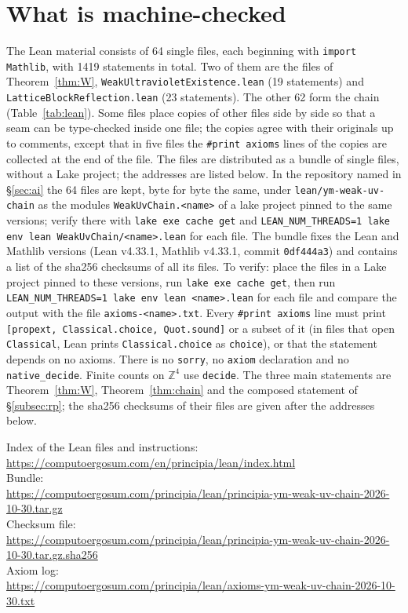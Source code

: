 \documentclass[11pt,a4paper]{article}
\theoremstyle{definition}
\theoremstyle{remark}
\begin{document}
\section{What is machine-checked}\label{sec:lean}

The Lean material consists of 64 single files, each beginning with \texttt{import Mathlib}, with 1419 statements in total. Two of them are the files of Theorem~\ref{thm:W}, \texttt{WeakUltraviolet\allowbreak{}Existence.lean} (19 statements) and \texttt{LatticeBlock\allowbreak{}Reflection.lean} (23 statements). The other 62 form the chain (Table~\ref{tab:lean}). Some files place copies of other files side by side so that a seam can be type-checked inside one file; the copies agree with their originals up to comments, except that in five files the \texttt{\#print axioms} lines of the copies are collected at the end of the file. The files are distributed as a bundle of single files, without a Lake project; the addresses are listed below. In the repository named in \S\ref{sec:ai} the 64 files are kept, byte for byte the same, under \texttt{lean/\allowbreak{}ym-weak-uv-chain} as the modules \texttt{WeakUvChain.<name>} of a lake project pinned to the same versions; verify there with \texttt{lake exe cache get} and \texttt{LEAN\_NUM\_THREADS=1 lake env lean WeakUvChain/\allowbreak{}<name>.lean} for each file. The bundle fixes the Lean and Mathlib versions (Lean v4.33.1, Mathlib v4.33.1, commit \texttt{0df444a3}) and contains a list of the sha256 checksums of all its files. To verify: place the files in a Lake project pinned to these versions, run \texttt{lake exe cache get}, then run \texttt{LEAN\_NUM\_THREADS=1 lake env lean <name>.lean} for each file and compare the output with the file \texttt{axioms-<name>.txt}. Every \texttt{\#print axioms} line must print \texttt{[propext, Classical.choice, Quot.sound]} or a subset of it (in files that open \texttt{Classical}, Lean prints \texttt{Classical.choice} as \texttt{choice}), or that the statement depends on no axioms. There is no \texttt{sorry}, no \texttt{axiom} declaration and no \texttt{native\_decide}. Finite counts on $\mathbb Z^4$ use \texttt{decide}. The three main statements are Theorem~\ref{thm:W}, Theorem~\ref{thm:chain} and the composed statement of \S\ref{subsec:rp}; the sha256 checksums of their files are given after the addresses below.
\begin{flushleft}\scriptsize
Index of the Lean files and instructions:\\
\url{https://computoergosum.com/en/principia/lean/index.html}\\
Bundle:\\
\url{https://computoergosum.com/principia/lean/principia-ym-weak-uv-chain-2026-10-30.tar.gz}\\
Checksum file:\\
\url{https://computoergosum.com/principia/lean/principia-ym-weak-uv-chain-2026-10-30.tar.gz.sha256}\\
Axiom log:\\
\url{https://computoergosum.com/principia/lean/axioms-ym-weak-uv-chain-2026-10-30.txt}
\end{flushleft}
\end{document}
